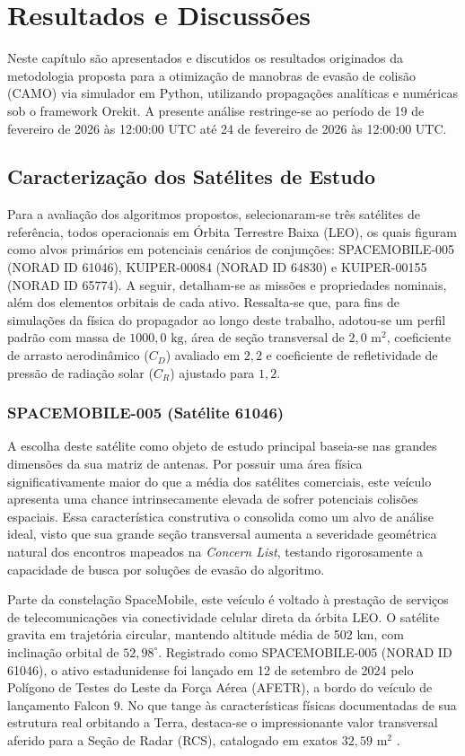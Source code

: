 \chapter{Resultados e Discussões}

Neste capítulo são apresentados e discutidos os resultados originados da metodologia proposta para a otimização de manobras de evasão de colisão (CAMO) via simulador em Python, utilizando propagações analíticas e numéricas sob o framework Orekit. A presente análise restringe-se ao período de 19 de fevereiro de 2026 às 12:00:00 UTC até 24 de fevereiro de 2026 às 12:00:00 UTC.

\section{Caracterização dos Satélites de Estudo}

Para a avaliação dos algoritmos propostos, selecionaram-se três satélites de referência, todos operacionais em Órbita Terrestre Baixa (LEO), os quais figuram como alvos primários em potenciais cenários de conjunções: SPACEMOBILE-005 (NORAD ID 61046), KUIPER-00084 (NORAD ID 64830) e KUIPER-00155 (NORAD ID 65774). A seguir, detalham-se as missões e propriedades nominais, além dos elementos orbitais de cada ativo. Ressalta-se que, para fins de simulações da física do propagador ao longo deste trabalho, adotou-se um perfil padrão com massa de $1000,0\text{ kg}$, área de seção transversal de $2,0\text{ m}^2$, coeficiente de arrasto aerodinâmico ($C_D$) avaliado em $2,2$ e coeficiente de refletividade de pressão de radiação solar ($C_R$) ajustado para $1,2$.

\subsection{SPACEMOBILE-005 (Satélite 61046)}

A escolha deste satélite como objeto de estudo principal baseia-se nas grandes dimensões da sua matriz de antenas. Por possuir uma área física significativamente maior do que a média dos satélites comerciais, este veículo apresenta uma chance intrinsecamente elevada de sofrer potenciais colisões espaciais. Essa característica construtiva o consolida como um alvo de análise ideal, visto que sua grande seção transversal aumenta a severidade geométrica natural dos encontros mapeados na \textit{Concern List}, testando rigorosamente a capacidade de busca por soluções de evasão do algoritmo.

Parte da constelação SpaceMobile, este veículo é voltado à prestação de serviços de telecomunicações via conectividade celular direta da órbita LEO. O satélite gravita em trajetória circular, mantendo altitude média de 502 km, com inclinação orbital de $52,98^\circ$. Registrado como SPACEMOBILE-005 (NORAD ID 61046), o ativo estadunidense foi lançado em 12 de setembro de 2024 pelo Polígono de Testes do Leste da Força Aérea (AFETR), a bordo do veículo de lançamento Falcon 9. No que tange às características físicas documentadas de sua estrutura real orbitando a Terra, destaca-se o impressionante valor transversal aferido para a Seção de Radar (RCS), catalogado em exatos $32,59\text{ m}^2$ .

